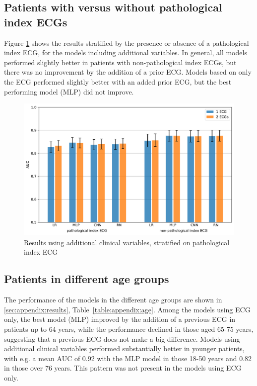 \documentclass[preprint]{elsarticle}
\begin{document}
\subsection{Patients with versus without pathological index ECGs}
Figure \ref{fig:pathresults} shows the results stratified by the presence or absence of a pathological index ECG, for the models including additional variables. In general, all models performed slightly better in patients with non-pathological index ECGs, but there was no improvement by the addition of a prior ECG. Models based on only the ECG performed slightly better with an added prior ECG, but the best performing model (MLP) did not improve. 

\begin{figure}[h!]
    \includegraphics[width=\linewidth]{path_results.pdf}
    \caption{Results using additional clinical variables, stratified on pathological index ECG}
    \label{fig:pathresults}
\end{figure}

\subsection{Patients in different age groups}
The performance of the models in the different age groups are shown in \ref{sec:appendix:results}, Table~\ref{table:appendix:age}. Among the models using ECG only, the best model (MLP) improved by the addition of a previous ECG in patients up to 64 years, while the performance declined in those aged 65-75 years, suggesting that a previous ECG does not make a big difference. Models using additional clinical variables performed substantially better in younger patients, with e.g. a mean AUC of 0.92 with the MLP model in those 18-50 years and 0.82 in those over 76 years. This pattern was not present in the models using ECG only.
\end{document}
